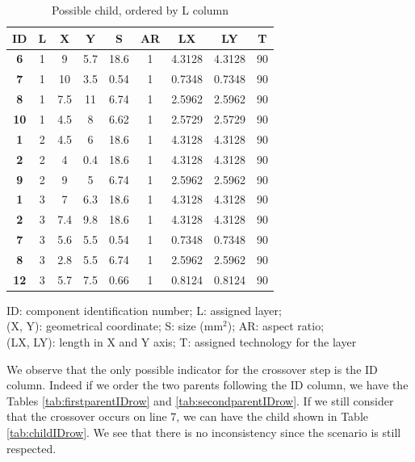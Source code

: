 \begin{table}[pt]
\caption{Possible child, ordered by L column}
\begin{center}
\begin{scriptsize}
\begin{tabular}{|c|c|c|c|c|c|c|c|c|}
\hline ID & L & X & Y & S & AR & LX & LY & T\\
\hline \textbf{6} & 1 & 9 & 5.7 & 18.6 & 1 & 4.3128 & 4.3128 & 90\\
\textbf{7} & 1 & 10 & 3.5 & 0.54 & 1 & 0.7348 & 0.7348 & 90\\
\textbf{8} & 1 & 7.5 & 11 & 6.74 & 1 & 2.5962 & 2.5962 & 90\\
\textbf{10} & 1 & 4.5 & 8 & 6.62 & 1 & 2.5729 & 2.5729 & 90\\
\textbf{1} & 2 & 4.5 & 6 & 18.6 & 1 & 4.3128 & 4.3128 & 90\\
\textbf{2} & 2 & 4 & 0.4 & 18.6 & 1 & 4.3128 & 4.3128 & 90\\
\textbf{9} & 2 & 9 & 5 & 6.74 & 1 & 2.5962 & 2.5962 & 90\\
\textbf{1} & 3 & 7 & 6.3 & 18.6 & 1 & 4.3128 & 4.3128 & 90\\
\textbf{2} & 3 & 7.4 & 9.8 & 18.6 & 1 & 4.3128 & 4.3128 & 90\\
\textbf{7} & 3 & 5.6 & 5.5 & 0.54 & 1 & 0.7348 & 0.7348 & 90\\
\textbf{8} & 3 & 2.8 & 5.5 & 6.74 & 1 & 2.5962 & 2.5962 & 90\\
\textbf{12} & 3 & 5.7 & 7.5 & 0.66 & 1 & 0.8124 & 0.8124 & 90\\
\hline
\end{tabular}
\end{scriptsize}
\end{center}
\begin{center}
\begin{scriptsize}
ID: component identification number; L: assigned layer;\\
(X, Y): geometrical coordinate; S: size (mm$^2$); AR: aspect ratio;\\
(LX, LY): length in X and Y axis; T: assigned technology for the layer
\end{scriptsize}
\end{center}
\label{tab:childLrow}
\end{table}

We observe that the only possible indicator for the crossover step is the ID column. Indeed if we order the two parents following the ID column, we have the Tables \ref{tab:firstparentIDrow} and \ref{tab:secondparentIDrow}. If we still consider that the crossover occurs on line 7, we can have the child shown in Table \ref{tab:childIDrow}. We see that there is no inconsistency since the scenario is still respected.

